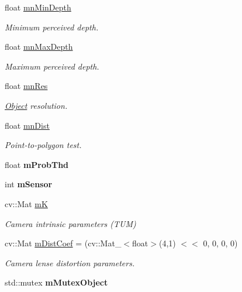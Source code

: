 \begin{DoxyCompactItemize}
float \hyperlink{classObject_a98a79df663772f156d9dcb10f5de3dfe}{mn\+Min\+Depth}
\begin{DoxyCompactList}\small\item\em Minimum perceived depth. \end{DoxyCompactList}\item 
\mbox{\label{classObject_ad8d8002cdaacd83e40034ab1b5f7d911}} 
float \hyperlink{classObject_ad8d8002cdaacd83e40034ab1b5f7d911}{mn\+Max\+Depth}
\begin{DoxyCompactList}\small\item\em Maximum perceived depth. \end{DoxyCompactList}\item 
\mbox{\label{classObject_ae5eea391874be8f3eb266d81e17f2226}} 
float \hyperlink{classObject_ae5eea391874be8f3eb266d81e17f2226}{mn\+Res}
\begin{DoxyCompactList}\small\item\em \hyperlink{classObject}{Object} resolution. \end{DoxyCompactList}\item 
\mbox{\label{classObject_a0ec14c1b27b32ab767db6260afeea589}} 
float \hyperlink{classObject_a0ec14c1b27b32ab767db6260afeea589}{mn\+Dist}
\begin{DoxyCompactList}\small\item\em Point-\/to-\/polygon test. \end{DoxyCompactList}\item 
\mbox{\label{classObject_a378aecb006051eee845c107994cfadd8}} 
float {\bfseries m\+Prob\+Thd}
\item 
\mbox{\label{classObject_ab648d7302834a422496368e5d7532ddb}} 
int {\bfseries m\+Sensor}
\item 
cv\+::\+Mat \hyperlink{classObject_a9cd6392d2ccce339a115090f02275e12}{mK}
\begin{DoxyCompactList}\small\item\em Camera intrinsic parameters (T\+UM) \end{DoxyCompactList}\item 
\mbox{\label{classObject_a3ae09a637a49579e135cd031307d6f9c}} 
cv\+::\+Mat \hyperlink{classObject_a3ae09a637a49579e135cd031307d6f9c}{m\+Dist\+Coef} = (cv\+::\+Mat\+\_\+$<$float$>$(4,1) $<$$<$ 0, 0, 0, 0)
\begin{DoxyCompactList}\small\item\em Camera lense distortion parameters. \end{DoxyCompactList}\item 
\mbox{\label{classObject_af22d050229447532f43c27561a2e6a2c}} 
std\+::mutex {\bfseries m\+Mutex\+Object}
\end{DoxyCompactItemize}


